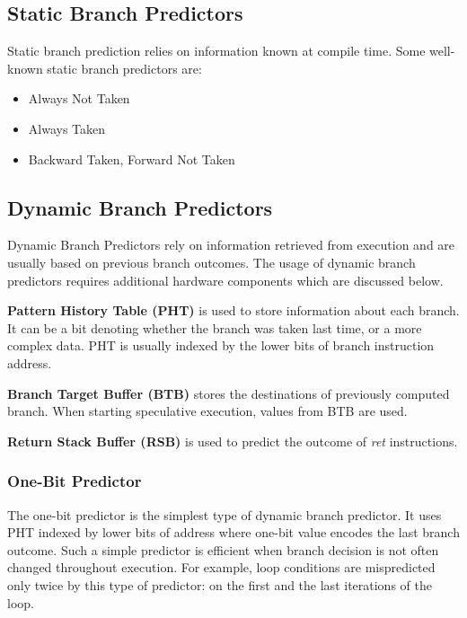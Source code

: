 \subsection{Static Branch Predictors}

Static branch prediction relies on information known at compile time. Some well-known static branch predictors are:

\begin{itemize}
    \item Always Not Taken
    \item Always Taken
    \item Backward Taken, Forward Not Taken
\end{itemize}


\subsection{Dynamic Branch Predictors}

Dynamic Branch Predictors rely on information retrieved from execution and are usually based on previous branch outcomes. The usage of dynamic branch predictors requires additional hardware components which are discussed below.

\textbf{Pattern History Table (PHT)} is used to store information about each branch. It can be a bit denoting whether the branch was taken last time, or a more complex data. PHT is usually indexed by the lower bits of branch instruction address.

\textbf{Branch Target Buffer (BTB)} stores the destinations of previously computed branch. When starting speculative execution, values from BTB are used.

\textbf{Return Stack Buffer (RSB)} is used to predict the outcome of \textit{ret} instructions.

\subsubsection{One-Bit Predictor}

The one-bit predictor is the simplest type of dynamic branch predictor. It uses PHT indexed by lower bits of address where one-bit value encodes the last branch outcome. Such a simple predictor is efficient when branch decision is not often changed throughout execution. For example, loop conditions are mispredicted only twice by this type of predictor: on the first and the last iterations of the loop.

